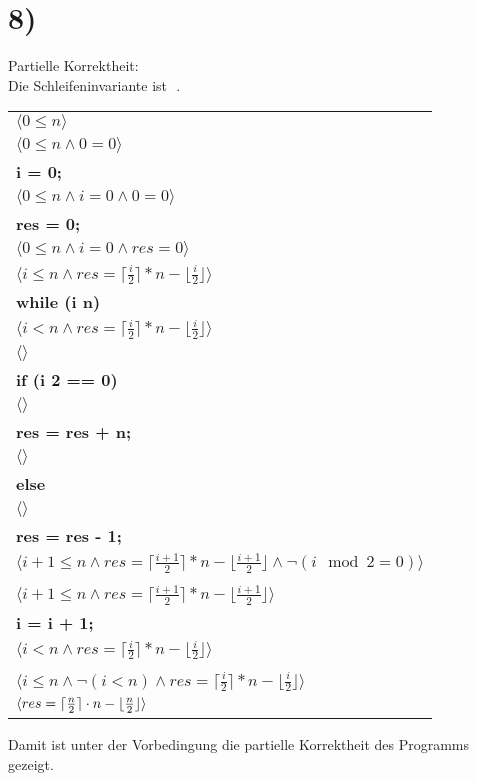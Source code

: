 \documentclass[12pt]{article}
\DeclarePairedDelimiter\ceil{\lceil}{\rceil}
\DeclarePairedDelimiter\floor{\lfloor}{\rfloor}
\begin{document}
\section{8)}
\begin{center}
    Partielle Korrektheit:\\
    Die Schleifeninvariante ist $ $ .
\bigbreak
\begin{tabular}{l}
    $\langle 0 \leq n \rangle$\\
    $\langle 0 \leq n \wedge 0 = 0 \rangle$\\
    \quad \textbf{i = 0;}\\
    $\langle 0 \leq n \wedge i = 0 \wedge 0 = 0\rangle$\\
    \quad \textbf{res = 0;}\\
    $\langle 0 \leq n \wedge i = 0 \wedge res = 0\rangle$\\
    $\langle i \leq n \wedge res = \lceil \frac{i}{2}\rceil * n - \lfloor\frac{i}{2} \rfloor \rangle$\\
    \quad \textbf{while (i \pmb{$<$} n)} \pmb{\{} \\
    \quad \quad$\langle i < n \wedge res = \lceil \frac{i}{2}\rceil * n - \lfloor\frac{i}{2} \rfloor\rangle$\\
    \quad \quad$\langle \rangle$\\
    \quad \quad \quad \textbf{if (i \pmb{$\%$} 2 == 0)} \pmb{\{} \\
    \quad \quad \quad \quad$\langle \rangle$\\
    \quad \quad \quad \quad \quad \textbf{res = res + n;}\\
    \quad \quad \quad \quad$\langle \rangle$\\
    \quad \quad \quad \pmb{\}} \textbf{else} \pmb{\{} \\
    \quad \quad \quad \quad$\langle \rangle$\\
    \quad \quad \quad \quad \quad \textbf{res = res - 1;}\\
    \quad \quad \quad \quad$\langle i+1 \leq n \wedge res = \lceil \frac{i+1}{2}\rceil * n - \lfloor\frac{i+1}{2} \rfloor \wedge \neg(i \mod{2} = 0)\rangle$\\
    \quad \quad \quad \pmb{\}}\\
    \quad \quad$\langle i+1 \leq n \wedge res = \lceil \frac{i+1}{2}\rceil * n - \lfloor\frac{i+1}{2} \rfloor\rangle$\\
    \quad \quad \quad \textbf{i = i + 1;}\\
    \quad \quad$\langle i < n \wedge res = \lceil \frac{i}{2}\rceil * n - \lfloor\frac{i}{2} \rfloor\rangle$\\
    \quad \pmb{\}}\\
    $\langle i \leq n \wedge \neg(i<n) \wedge res = \lceil \frac{i}{2}\rceil * n - \lfloor\frac{i}{2} \rfloor \rangle$\\
    $\langle res = \ceil{\frac{n}{2}} \cdot n - \floor{\frac{n}{2}} \rangle$\\
\end{tabular}
\bigbreak
Damit ist unter der Vorbedingung die partielle Korrektheit des Programms gezeigt.
\bigbreak


\end{center}
\end{document}
